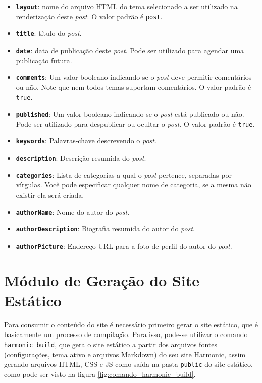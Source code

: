 \documentclass[ppginf, pep]{esinucpel}
\newcommand{\code}[1]{\texttt{#1}}
\begin{document}
\begin{itemize}
	\item \textbf{\code{layout}}: nome do arquivo HTML do tema selecionado a ser utilizado na renderização deste \textit{post}. O valor padrão é \code{post}.
	\item \textbf{\code{title}}: título do \textit{post}.
	\item \textbf{\code{date}}: data de publicação deste \textit{post}. Pode ser utilizado para agendar uma publicação futura.
	\item \textbf{\code{comments}}: Um valor booleano indicando se o \textit{post} deve permitir comentários ou não. Note que nem todos temas suportam comentários. O valor padrão é \code{true}.
	\item \textbf{\code{published}}: Um valor booleano indicando se o \textit{post} está publicado ou não. Pode ser utilizado para despublicar ou ocultar o \textit{post}. O valor padrão é \code{true}.
	\item \textbf{\code{keywords}}: Palavras-chave descrevendo o \textit{post}.
	\item \textbf{\code{description}}: Descrição resumida do \textit{post}.
	\item \textbf{\code{categories}}: Lista de categorias a qual o \textit{post} pertence, separadas por vírgulas. Você pode especificar qualquer nome de categoria, se a mesma não existir ela será criada.
	\item \textbf{\code{authorName}}: Nome do autor do \textit{post}.
	\item \textbf{\code{authorDescription}}: Biografia resumida do autor do \textit{post}.
	\item \textbf{\code{authorPicture}}: Endereço URL para a foto de perfil do autor do \textit{post}.
\end{itemize}

\section{Módulo de Geração do Site Estático}

Para consumir o conteúdo do site é necessário primeiro gerar o site estático, que é basicamente um processo de compilação. Para isso, pode-se utilizar o comando \code{harmonic build}, que gera o site estático a partir dos arquivos fontes (configurações, tema ativo e arquivos Markdown) do seu site Harmonic, assim gerando arquivos HTML, CSS e JS como saída na pasta \code{public} do site estático, como pode ser visto na figura \ref{fig:comando_harmonic_build}.
\end{document}
